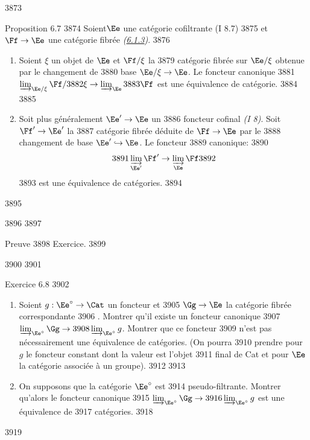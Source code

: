   3873	\begin{enonce*}{Proposition 6.7}
  3874	Soient\pageoriginale $\Ee$ une catégorie cofiltrante (I 8.7)
  3875	et $\Ff \to \Ee$ une catégorie fibrée \emph{(\hyperref[VI.subsubsec6.1.3]{6.1.3})}.
  3876	\begin{enumerate}
  3877	\renewcommand{\labelenumi}{\theenumi)}
  3878	\item Soient $\xi$ un objet de $\Ee$ et $\Ff/\xi$ la
  3879	  catégorie fibrée sur $\Ee/\xi$ obtenue par le changement de
  3880	  base $\Ee/\xi \to \Ee$. Le foncteur canonique
  3881	  $\varinjlim_{\Ee/\xi} \Ff /
  3882	  \xi \to \varinjlim_{\Ee}
  3883	  \Ff $ est une équivalence de catégorie.
  3884	
  3885	\item Soit plus généralement $\Ee' \to \Ee$ un
  3886	  foncteur cofinal \emph{(I 8)}. Soit $\Ff'\to \Ee'$ la
  3887	  catégorie fibrée déduite de $\Ff \to \Ee$ par le
  3888	  changement de base $\Ee'\hookrightarrow \Ee$. Le foncteur
  3889	  canonique:
  3890	$$
  3891	\varinjlim_{\Ee'} \Ff' \to \varinjlim_{\Ee} \Ff
  3892	$$
  3893	est une équivalence de catégories.
  3894	\end{enumerate}
  3895	\end{enonce*}
  3896	
  3897	\begin{enonce*}[remark]{Preuve}
  3898	Exercice.
  3899	\end{enonce*}
  3900	
  3901	\begin{enonce*}[remark]{Exercice 6.8}
  3902	\begin{enumerate}
  3903	\renewcommand{\labelenumi}{\theenumi)}
  3904	\item Soient $g : {\Ee}^{\circ} \to \Cat$ un foncteur et
  3905	  $\Gg \to \Ee$ la catégorie fibrée correspondante
  3906	  \cite{5}. Montrer qu'il existe un foncteur canonique
  3907	  $\varinjlim_{\Ee^{\circ}} \Gg \to
  3908	  \varinjlim_{\Ee^{\circ}} g$. Montrer que ce foncteur
  3909	  n'est pas nécessairement une équivalence de catégories. (On pourra
  3910	  prendre pour $g$ le foncteur constant dont la valeur est l'objet
  3911	  final de Cat et pour $\Ee$ la catégorie associée à un groupe).
  3912	
  3913	\item On supposons que la catégorie $\Ee^{\circ}$ est
  3914	  pseudo-filtrante. Montrer qu'alors le foncteur canonique
  3915	  $\varinjlim_{\Ee^{\circ}} \Gg \to
  3916	  \varinjlim_{\Ee^{\circ}} g$ est une équivalence de
  3917	  catégories.
  3918	\end{enumerate}
  3919	\end{enonce*}
